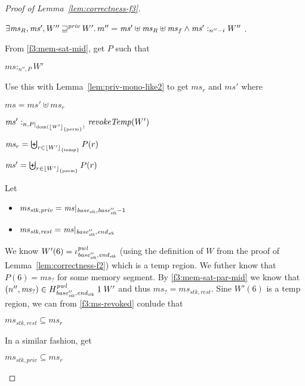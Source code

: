 \documentclass[a4paper]{article}
\DeclarePairedDelimiter\floor{\lfloor}{\rfloor}
\DeclareMathOperator{\dom}{dom}
\newcommand{\var}[1]{\mathit{#1}}
\newcommand{\hs}{\var{ms}}
\newcommand{\ms}{\hs}
\newcommand{\start}{\var{base}}
\newcommand{\addrend}{\var{end}}
\newcommand{\heap}{\var{mem}}
\newcommand{\stk}{\var{stk}}
\newcommand{\pwl}{\var{pwl}}
\newcommand{\plainfun}[2]{
  \ifthenelse{\equal{#2}{}}
  {\mathit{#1}}
  {\mathit{#1}(#2)}
}
\newcommand{\revokeTemp}[1]{\plainfun{revokeTemp}{#1}}
\newcommand{\erase}[2]{\floor*{#1}_{\{#2\}}}
\newcommand{\futurestr}{\mathbin{\sqsupseteq}^{\var{priv}}}
\newcommand{\heapSat}[3][\heap]{#1 :_{#2} #3}
\newcommand{\memSatPar}[4][n]{\heapSat[#2]{#1 , #4}{#3}}
\newcommand{\npair}[2][n]{\left(#1,#2 \right)}
\newcommand{\plainview}[1]{\mathrm{#1}}
\newcommand{\perma}{\plainview{perm}}
\newcommand{\temp}{\plainview{temp}}
\begin{document}
\begin{proof}[Proof of Lemma~\ref{lem:correctness-f3}]
\begin{enumproof}[start=3]
\begin{enumproof}[start=3]
      \begin{enumproof}
      \item $\exists \ms_R,\ms', W'' \futurestr W' \ldotp m'' = \ms' \uplus \ms_R \uplus \ms_f \land \heapSat[\ms']{n''-i}{W''}$ \label{f3:proof-burden}.
      \end{enumproof}
      From \ref{f3:mem-sat-mid}, get $P$ such that 
      \begin{enumproof}[resume]
      \item $\memSatPar[n'']{\ms}{W'}{P}$ \label{f3:mem-sat-par-mid}
      \end{enumproof}
      Use this with Lemma~\ref{lem:priv-mono-like2} to get $\ms_r$ and $\ms'$ where
      \begin{enumproof}[resume]
      \item $\ms = \ms' \uplus \ms_r$
      \item $\memSatPar{\ms'}{\revokeTemp{W'}}{P|_{\dom(\erase{W'}{\perma})}}$ \label{f3:perm-mem-sat}
      \item $\ms_r = \biguplus_{r \in \erase{W'}{\temp}} P(r)$ \label{f3:ms-revoked}
      \item $\ms' = \biguplus_{r \in \erase{W'}{\perma}} P(r)$
      \end{enumproof}
      Let
      \begin{itemize}
      \item $\ms_{\stk,\var{priv}} = \ms |_{\start_\stk,\base_\stk''-1}$
      \item $\ms_{\stk,\var{rest}} = \ms |_{\base_\stk'',\addrend_\stk}$
      \end{itemize}
      We know $W'(6)=\iota^\pwl_{\base_\stk'',\addrend_\stk}$ (using the definition of $W$ from the proof of Lemma~\ref{lem:correctness-f2}) which is a $\temp$ region. We futher know that $P(6) = \ms_{\var{?}}$ for some memory segment. By \ref{f3:mem-sat-par-mid} we know that $\npair[n'']{\ms_?} \in H^\pwl_{\base_\stk'',\addrend_\stk} \; 1 \; W'$ and thus $\ms_? = \ms_{\stk,\var{rest}}$. Sine $W'(6)$ is a $\temp$ region, we can from \ref{f3:ms-revoked} conlude that 
      \begin{enumproof}[resume]
      \item $\ms_{\stk,\var{rest}} \subseteq \ms_r$
      \end{enumproof}
      In a similar fashion, get
      \begin{enumproof}[resume]
      \item $\ms_{\stk,\var{priv}} \subseteq \ms_r$
      \end{enumproof}


\end{enumproof}
\end{enumproof}
\end{proof}
\end{document}
